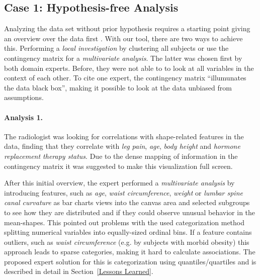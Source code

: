 \documentclass[journal]{style/vgtc} 			          %
\begin{document}
\subsection{Case 1: Hypothesis-free Analysis} \label{Hypothesis-free analysis}
Analyzing the data set without prior hypothesis requires a starting point giving an overview over the data first \cite{Shneiderman1996}.
%
With our tool, there are two ways to achieve this.
%
Performing a \emph{local investigation} by clustering all subjects or use the contingency matrix for a \emph{multivariate analysis}.
%
The latter was chosen first by both domain experts.
%
Before, they were not able to to look at all variables in the context of each other.
%
%
To cite one expert, the contingency matrix ``illumunates the data black box'', making it possible to look at the data unbiased from assumptions.

\paragraph{Analysis 1.}
%
The radiologist was looking for correlations with shape-related features in the data, finding that they correlate with \emph{leg pain}, \emph{age}, \emph{body height} and \emph{hormone replacement therapy status}.
%
Due to the dense mapping of information in the contingency matrix it was suggested to make this visualization full screen.

After this initial overview, the expert performed a \emph{multivariate analysis} by introducing features, such as \emph{age}, \emph{waist circumference}, \emph{weight} or \emph{lumbar spine canal curvature} as bar charts views into the canvas area and selected subgroups to see how they are distributed and if they could observe unusual behavior in the mean-shapes.
%
This pointed out problems with the used categorization method splitting numerical variables into equally-sized ordinal bins.
%
If a feature contains outliers, such as \emph{waist circumference} (e.g. by subjects with morbid obesity) this approach leads to sparse categories, making it hard to calculate associations.
%
The proposed expert solution for this is categorization using quantiles/quartiles and is described in detail in Section~\ref{Lessons Learned}.
\end{document}
